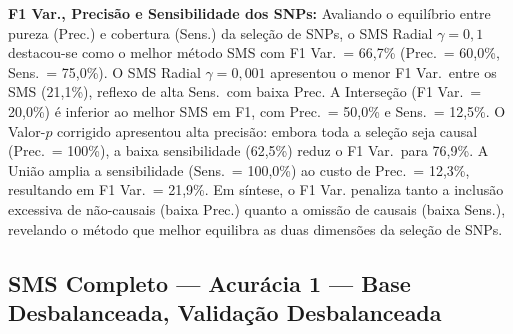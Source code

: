 \documentclass[12pt,a4paper]{article}
\newcommand{\novo}[1]{\textcolor{corNova}{#1}}
\begin{document}
\novo{\textbf{F1 Var., Precisão e Sensibilidade dos SNPs:} Avaliando o equilíbrio entre pureza (Prec.) e cobertura (Sens.) da seleção de SNPs, o SMS Radial $\gamma=0{,}1$ destacou-se como o melhor método SMS com F1 Var.\ = 66,7\% (Prec.\ = 60,0\%, Sens.\ = 75,0\%). O SMS Radial $\gamma=0{,}001$ apresentou o menor F1 Var.\ entre os SMS (21,1\%), reflexo de alta Sens.\ com baixa Prec. A Interseção (F1 Var.\ = 20,0\%) é inferior ao melhor SMS em F1, com Prec.\ = 50,0\% e Sens.\ = 12,5\%. O Valor-$p$ corrigido apresentou alta precisão: embora toda a seleção seja causal (Prec.\ = 100\%), a baixa sensibilidade (62,5\%) reduz o F1 Var.\ para 76,9\%. A União amplia a sensibilidade (Sens.\ = 100,0\%) ao custo de Prec.\ = 12,3\%, resultando em F1 Var.\ = 21,9\%. Em síntese, o F1 Var. penaliza tanto a inclusão excessiva de não-causais (baixa Prec.) quanto a omissão de causais (baixa Sens.), revelando o método que melhor equilibra as duas dimensões da seleção de SNPs.}
\subsection{SMS Completo --- Acurácia 1 --- Base Desbalanceada, Validação Desbalanceada}
\end{document}
